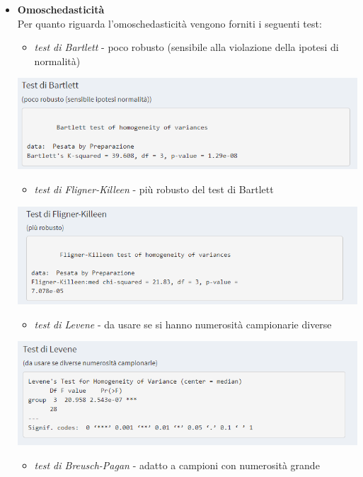 \documentclass[
  11pt,
]{book}
\providecommand{\tightlist}{%
  \setlength{\itemsep}{0pt}\setlength{\parskip}{0pt}}
\begin{document}
\begin{itemize}
\item
  \textbf{Omoschedasticità}\\
  Per quanto riguarda l'omoschedasticità vengono forniti i seguenti test:

  \begin{itemize}
  \tightlist
  \item
    \emph{test di Bartlett} - poco robusto (sensibile alla violazione della ipotesi di normalità)
  \end{itemize}

  \begin{center}\includegraphics[width=0.5\linewidth]{Immagini/Anova/07_omo1} \end{center}

  \begin{itemize}
  \tightlist
  \item
    \emph{test di Fligner-Killeen} - più robusto del test di Bartlett
  \end{itemize}

  \begin{center}\includegraphics[width=0.5\linewidth]{Immagini/Anova/08_omo2} \end{center}

  \begin{itemize}
  \tightlist
  \item
    \emph{test di Levene} - da usare se si hanno numerosità campionarie diverse
  \end{itemize}

  \begin{center}\includegraphics[width=0.5\linewidth]{Immagini/Anova/09_omo3} \end{center}

  \begin{itemize}
  \tightlist
  \item
    \emph{test di Breusch-Pagan} - adatto a campioni con numerosità grande
  \end{itemize}


\end{itemize}
\end{document}
